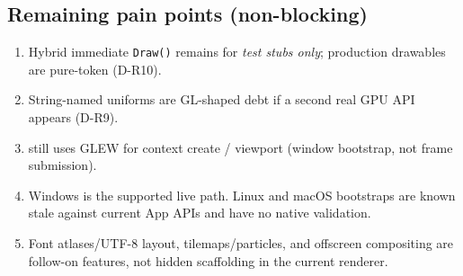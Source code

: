 \subsection{Remaining pain points (non-blocking)}
\begin{enumerate}
  \item Hybrid immediate \texttt{Draw()} remains for \emph{test stubs only};
        production drawables are pure-token (D-R10).
  \item String-named uniforms are GL-shaped debt if a second real GPU API appears
        (D-R9).
  \item {} still uses GLEW for context create / viewport
        (window bootstrap, not frame submission).
  \item Windows is the supported live path. Linux and macOS bootstraps are
        known stale against current App APIs and have no native validation.
  \item Font atlases/UTF-8 layout, tilemaps/particles, and offscreen compositing
        are follow-on features, not hidden scaffolding in the current renderer.
\end{enumerate}
